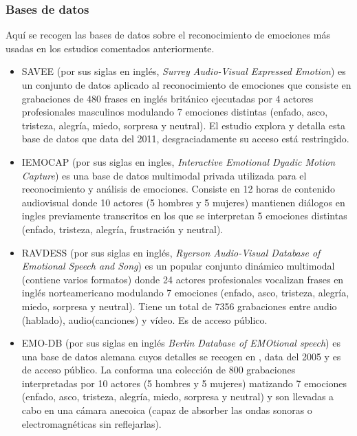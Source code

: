 \documentclass[11pt,a4paper,spanish]{book}
\begin{document}
	\subsubsection{Bases de datos}
	Aquí se recogen las bases de datos sobre el reconocimiento de emociones más usadas en los estudios comentados anteriormente.
	
	\begin{itemize}
		\item SAVEE (por sus siglas en inglés, \emph{ Surrey Audio-Visual Expressed Emotion}) es un conjunto de datos aplicado al reconocimiento de emociones que consiste en grabaciones de 480 frases en inglés británico ejecutadas por 4 actores profesionales masculinos modulando 7 emociones distintas (enfado, asco, tristeza, alegría, miedo, sorpresa y neutral). El estudio \cite{SAVEEdataset} explora y detalla esta base de datos que data del 2011, desgraciadamente su acceso está restringido.
		
		\item IEMOCAP (por sus siglas en ingles, \emph{Interactive Emotional Dyadic Motion Capture}) es una base de datos multimodal privada utilizada para el reconocimiento y análisis de emociones. Consiste en 12 horas de contenido audiovisual donde 10 actores (5 hombres y 5 mujeres) mantienen diálogos en ingles previamente transcritos en los que se interpretan 5 emociones distintas (enfado, tristeza, alegría, frustración y neutral).
		
		\item RAVDESS (por sus siglas en inglés, \emph{Ryerson Audio-Visual Database of Emotional Speech and Song}) es un popular conjunto dinámico multimodal (contiene varios formatos) donde 24 actores profesionales vocalizan frases en inglés norteamericano modulando 7 emociones (enfado, asco, tristeza, alegría, miedo, sorpresa y neutral). Tiene un total de 7356 grabaciones entre audio (hablado), audio(canciones) y vídeo. Es de acceso público.
		
		\item EMO-DB (por sus siglas en inglés \emph{Berlin Database of EMOtional speech}) es una base de datos alemana cuyos detalles se recogen en \cite{emodb2005}, data del 2005 y es de acceso público. La conforma una colección de 800 grabaciones interpretadas por 10 actores (5 hombres y 5 mujeres) matizando 7 emociones (enfado, asco, tristeza, alegría, miedo, sorpresa y neutral) y son llevadas a cabo en una cámara anecoica (capaz de absorber las ondas sonoras o electromagnéticas sin reflejarlas).
		
	\end{itemize}
\end{document}
